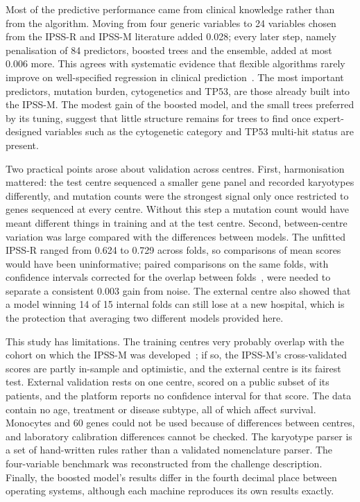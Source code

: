 \documentclass[10pt,letterpaper]{article}
\begin{document}
Most of the predictive performance came from clinical knowledge rather than from the
algorithm. Moving from four generic variables to 24 variables chosen from the IPSS-R and
IPSS-M literature added 0.028; every later step, namely penalisation of 84 predictors,
boosted trees and the ensemble, added at most 0.006 more. This agrees with systematic
evidence that flexible algorithms rarely improve on well-specified regression in clinical
prediction~\cite{christodoulou2019}. The most important predictors, mutation burden,
cytogenetics and TP53, are those already built into the IPSS-M. The modest gain of the
boosted model, and the small trees preferred by its tuning, suggest that little structure
remains for trees to find once expert-designed variables such as the cytogenetic category
and TP53 multi-hit status are present.

Two practical points arose about validation across centres. First, harmonisation mattered:
the test centre sequenced a smaller gene panel and recorded karyotypes differently, and
mutation counts were the strongest signal only once restricted to genes sequenced at every
centre. Without this step a mutation count would have meant different things in training
and at the test centre. Second, between-centre variation was large compared with the
differences between models. The unfitted IPSS-R ranged from 0.624 to 0.729 across folds,
so comparisons of mean scores would have been uninformative; paired comparisons on the same
folds, with confidence intervals corrected for the overlap between folds~\cite{nadeau2003},
were needed to separate a consistent 0.003 gain from noise. The external centre also showed
that a model winning 14 of 15 internal folds can still lose at a new hospital, which is
the protection that averaging two different models provided here.

This study has limitations. The training centres very probably overlap with the cohort on
which the IPSS-M was developed~\cite{bernard2022}; if so, the IPSS-M's cross-validated
scores are partly in-sample and optimistic, and the external centre is its fairest test.
External validation rests on one centre, scored on a public subset of its patients, and
the platform reports no confidence interval for that score. The
data contain no age, treatment or disease subtype, all of which affect survival. Monocytes
and 60 genes could not be used because of differences between centres, and laboratory
calibration differences cannot be checked. The karyotype parser is a set of hand-written
rules rather than a validated nomenclature parser. The four-variable benchmark was
reconstructed from the challenge description. Finally, the boosted model's results differ
in the fourth decimal place between operating systems, although each machine reproduces
its own results exactly.
\end{document}
